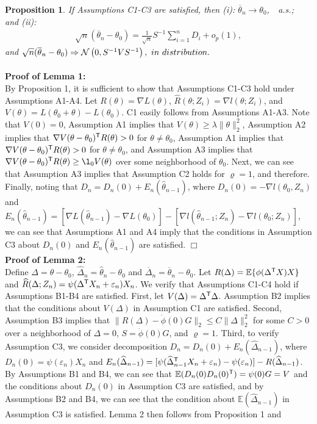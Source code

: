 \documentclass[12pt]{article}
\def\trans{^{\rm \textsf{T}}}
\def\wh{\widehat}
\def\ol{\overline}
\begin{document}
{\bf Proposition 1}. {\it If Assumptions C1-C3 are satisfied, then (i):	$\ol{\theta}_n\rightarrow\theta_0$,\ \  a.s.; \\
and (ii):
\begin{eqnarray}\label{sum-martingale-0}
\sqrt{n}(\ol{\theta}_n-\theta_0)=\frac{1}{\sqrt{n}}S^{-1}\sum_{i=1}^n D_i+ o_p(1),
\end{eqnarray}
and $\sqrt{n}(\ol{\theta}_n-\theta_0) \Rightarrow \mathcal{N}\left(0, S^{-1}VS^{-1}\right), {\mbox \ in \ distribution.}$ }\\
\\
{\bf Proof of Lemma 1:}\\
By Proposition 1, it is sufficient to show that Assumptions C1-C3 hold under Assumptions A1-A4.
Let $R(\theta)=\nabla L(\theta)$, $\wh{R}(\theta; Z_i)=\nabla l(\theta; Z_i)$, and $V(\theta)=L(\theta_0+\theta)-L(\theta_0)$.
C1 easily follows from Assumptions A1-A3. Note that $V(0)=0$,  Assumption A1 implies that $V(\theta)\geq \lambda\|\theta\|_2^2$, Assumption A2 implies that $\nabla V(\theta-\theta_0)\trans R(\theta)>0$ for $\theta\neq \theta_0$, Assumption A1 implies that $\nabla V(\theta-\theta_0)\trans R(\theta)>0$ for $\theta\neq \theta_0$, and Assumption A3 implies that $\nabla V(\theta-\theta_0)\trans R(\theta)\geq \l_0 V(\theta)$ over some neighborhood of $\theta_0$. Next, we can see that Assumption A3 implies that Assumption C2 holds for $\varrho=1$, and therefore. Finally, noting that $D_n=D_n(0)+E_n(\wh{\theta}_{n-1})$, where $D_n(0)=-\nabla l(\theta_0, Z_n)$ and $E_n(\wh{\theta}_{n-1})=[\nabla L(\wh{\theta}_{n-1})-\nabla L(\theta_0)]-[\nabla l(\wh{\theta}_{n-1}; Z_n)-\nabla l(\theta_0; Z_n)]$, we can see that Assumptions A1 and A4 imply that the conditions in Assumption C3 about $D_n(0)$ and $E_n(\wh{\theta}_{n-1})$ are satisfied. $\Box$
\\
{\bf Proof of Lemma 2:}\\
Define $\Delta=\theta-\theta_0$,  $\wh{\Delta}_{n}=\wh{\theta}_{n}-\theta_0$ and $\ol{\Delta}_n=\ol{\theta}_n-\theta_0$.  Let $R(\Delta)=\mathbb{E}\{\phi(\Delta\trans X)X\}$ and $\wh{R}(\Delta; Z_n)=\psi(\Delta\trans X_n+\varepsilon_n)X_n$. We verify that Assumptions C1-C4 hold if Assumptions B1-B4 are satisfied. First, let $V(\Delta)=\Delta\trans\Delta$. Assumption B2 implies that the conditions about $V(\Delta)$ in Assumption C1 are satisfied. Second, Assumption B3 implies that $\|R(\Delta)-\dot{\phi}(0)G\|_2\leq C\|\Delta\|_2^2$ for some $C>0$ over a neighborhood of $\Delta=0$, $S=\dot{\phi}(0)G$, and $\varrho=1$. Third, to verify Assumption C3, we consider decomposition $D_n=D_n(0)+E_n(\wh{\Delta}_{n-1})$, where $D_n(0)=\psi(\varepsilon_n)X_n$ and $E_n(\wh{\Delta}_{n-1})=[\psi(\wh{\Delta}_{n-1}\trans X_n+\varepsilon_n)-\psi(\varepsilon_n)]-R(\wh{\Delta}_{n-1})$. By Assumptions B1 and B4, we can see that $\mathbb{E}(D_n(0)D_n(0)\trans)=\psi(0)G=V$ and the conditions about $D_n(0)$ in Assumption C3 are satisfied, and by Assumptions B2 and B4, we can see that the condition about $\mathbb{E}(\wh{\Delta}_{n-1})$ in Assumption C3 is satisfied. Lemma 2 then follows  from Proposition 1 and
\end{document}
